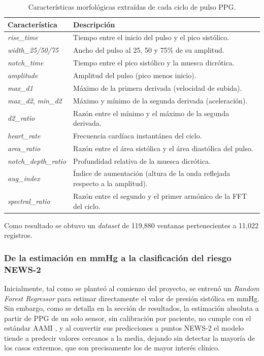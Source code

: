 \documentclass[11pt,a4paper]{article}
\begin{document}
\begin{table}[H]
\centering
\small
\begin{tabular}{>{\raggedright}p{3.3cm} p{10.5cm}}
\toprule
\textbf{Característica} & \textbf{Descripción} \\
\midrule
\textit{rise\_time} & Tiempo entre el inicio del pulso y el pico sistólico. \\
\textit{width\_25/50/75} & Ancho del pulso al 25, 50 y 75\% de su amplitud. \\
\textit{notch\_time} & Tiempo entre el pico sistólico y la muesca dicrótica. \\
\textit{amplitude} & Amplitud del pulso (pico menos inicio). \\
\textit{max\_d1} & Máximo de la primera derivada (velocidad de subida). \\
\textit{max\_d2}, \textit{min\_d2} & Máximo y mínimo de la segunda derivada (aceleración). \\
\textit{d2\_ratio} & Razón entre el mínimo y el máximo de la segunda derivada. \\
\textit{heart\_rate} & Frecuencia cardíaca instantánea del ciclo. \\
\textit{area\_ratio} & Razón entre el área sistólica y el área diastólica del pulso. \\
\textit{notch\_depth\_ratio} & Profundidad relativa de la muesca dicrótica. \\
\textit{aug\_index} & Índice de aumentación (altura de la onda reflejada respecto a la amplitud). \\
\textit{spectral\_ratio} & Razón entre el segundo y el primer armónico de la FFT del ciclo. \\
\bottomrule
\end{tabular}
\caption{Características morfológicas extraídas de cada ciclo de pulso PPG.}
\label{tab:features}
\end{table}

Como resultado se obtuvo un \textit{dataset} de 119,880 ventanas pertenecientes a 11,022 registros.

\subsubsection{De la estimación en mmHg a la clasificación del riesgo NEWS-2}

Inicialmente, tal como se planteó al comienzo del proyecto, se entrenó un \textit{Random Forest Regressor} para estimar directamente el valor de presión sistólica en mmHg. Sin embargo, como se detalla en la sección de resultados, la estimación absoluta a partir de PPG de un solo sensor, sin calibración por paciente, no cumple con el estándar AAMI \cite{ref23}, y al convertir sus predicciones a puntos NEWS-2 el modelo tiende a predecir valores cercanos a la media, dejando sin detectar la mayoría de los casos extremos, que son precisamente los de mayor interés clínico.
\end{document}
